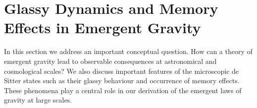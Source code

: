 \documentclass[a4paper,12pt]{article}
\begin{document}





\section{Glassy Dynamics and Memory Effects in Emergent Gravity }

In this section we address an important conceptual question.  How can a theory of emergent gravity lead to observable consequences at astronomical and cosmological scales? We also discuss important features of the microscopic de Sitter states such as their glassy behaviour and occurrence of memory effects. These phenomena play a central role in our derivation of the emergent laws of gravity at large scales. 
\end{document}
